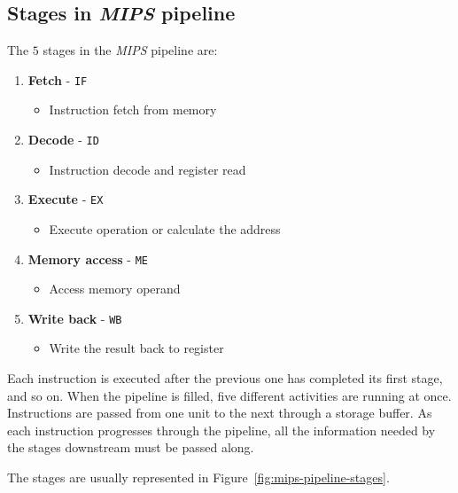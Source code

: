 \documentclass[english]{article}
\begin{document}
\subsection{Stages in \textit{MIPS} pipeline}

The \(5\) stages in the \textit{MIPS} pipeline are:

\begin{enumerate}
  \item \textbf{Fetch} - \texttt{IF}
        \begin{itemize}[label=\(\rightarrow\)]
          \item Instruction fetch from memory
        \end{itemize}
  \item \textbf{Decode} - \texttt{ID}
        \begin{itemize}[label=\(\rightarrow\)]
          \item Instruction decode and register read
        \end{itemize}
  \item \textbf{Execute} - \texttt{EX}
        \begin{itemize}[label=\(\rightarrow\)]
          \item Execute operation or calculate the address
        \end{itemize}
  \item \textbf{Memory access} - \texttt{ME}
        \begin{itemize}[label=\(\rightarrow\)]
          \item Access memory operand
        \end{itemize}
  \item \textbf{Write back} - \texttt{WB}
        \begin{itemize}[label=\(\rightarrow\)]
          \item Write the result back to register
        \end{itemize}
\end{enumerate}

Each instruction is executed after the previous one has completed its first stage, and so on.
When the pipeline is filled, five different activities are running at once.
Instructions are passed from one unit to the next through a storage buffer.
As each instruction progresses through the pipeline, all the information needed by the stages downstream must be passed along.

The stages are usually represented in Figure~\ref{fig:mips-pipeline-stages}.
\end{document}
